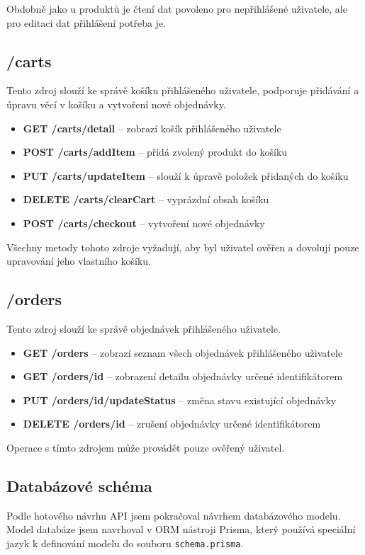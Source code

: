\documentclass[thesis=M,czech]{FITthesis}[2019/12/23]
\begin{document}
Obdobně jako u produktů je čtení dat povoleno pro nepřihlášené uživatele, ale pro editaci dat přihlášení potřeba je.

\subsection{/carts}
Tento zdroj slouží ke správě košíku přihlášeného uživatele, podporuje přidávání a úpravu věcí v košíku a vytvoření nové objednávky.

\begin{itemize}
  \item \textbf{GET /carts/detail} -- zobrazí košík přihlášeného uživatele
  \item \textbf{POST /carts/addItem} -- přidá zvolený produkt do košíku
  \item \textbf{PUT /carts/updateItem} -- slouží k úpravě položek přidaných do košíku
  \item \textbf{DELETE /carts/clearCart} -- vyprázdní obsah košíku
  \item \textbf{POST /carts/checkout} -- vytvoření nové objednávky
\end{itemize}

Všechny metody tohoto zdroje vyžadují, aby byl uživatel ověřen a dovolují pouze upravování jeho vlastního košíku.

\subsection{/orders}
Tento zdroj slouží ke správě objednávek přihlášeného uživatele.

\begin{itemize}
  \item \textbf{GET /orders} -- zobrazí seznam všech objednávek přihlášeného uživatele
  \item \textbf{GET /orders/{id}} -- zobrazení detailu objednávky určené identifikátorem
  \item \textbf{PUT /orders/{id}/updateStatus} -- změna stavu existující objednávky
  \item \textbf{DELETE /orders/{id}} -- zrušení objednávky určené identifikátorem
\end{itemize}

Operace s tímto zdrojem může provádět pouze ověřený uživatel.

\subsection*{Databázové schéma}
Podle hotového návrhu API jsem pokračoval návrhem databázového modelu. Model databáze jsem navrhoval v ORM nástroji Prisma, který používá speciální jazyk k definování modelu do souboru \texttt{schema.prisma}.
\end{document}
